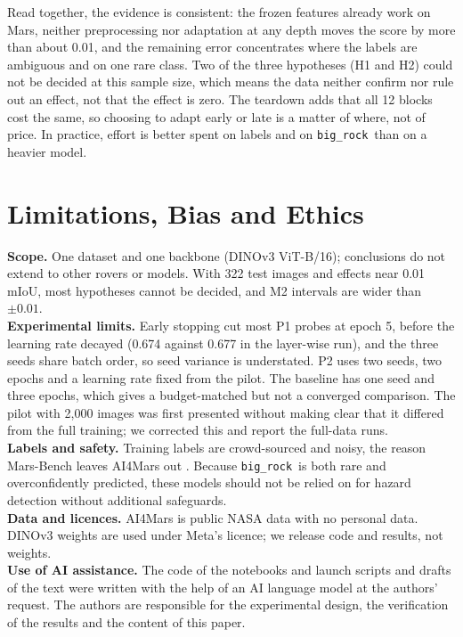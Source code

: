 \documentclass[conference]{IEEEtran}
\newcommand{\bigrock}{\texttt{big\_rock}}
\begin{document}
Read together, the evidence is consistent: the frozen features already work on Mars, neither preprocessing nor adaptation at any depth moves the score by more than about 0.01, and the remaining error concentrates where the labels are ambiguous and on one rare class. Two of the three hypotheses (H1 and H2) could not be decided at this sample size, which means the data neither confirm nor rule out an effect, not that the effect is zero. The teardown adds that all 12 blocks cost the same, so choosing to adapt early or late is a matter of where, not of price. In practice, effort is better spent on labels and on \bigrock\ than on a heavier model.

\section{Limitations, Bias and Ethics}\label{sec:limits}
\textbf{Scope.} One dataset and one backbone (DINOv3 ViT-B/16); conclusions do not extend to other rovers or models. With 322 test images and effects near 0.01 mIoU, most hypotheses cannot be decided, and M2 intervals are wider than $\pm0.01$.\\
\textbf{Experimental limits.} Early stopping cut most P1 probes at epoch 5, before the learning rate decayed (0.674 against 0.677 in the layer-wise run), and the three seeds share batch order, so seed variance is understated. P2 uses two seeds, two epochs and a learning rate fixed from the pilot. The baseline has one seed and three epochs, which gives a budget-matched but not a converged comparison. The pilot with 2{,}000 images was first presented without making clear that it differed from the full training; we corrected this and report the full-data runs.\\
\textbf{Labels and safety.} Training labels are crowd-sourced and noisy, the reason Mars-Bench leaves AI4Mars out \cite{purohit2025marsbench}. Because \bigrock\ is both rare and overconfidently predicted, these models should not be relied on for hazard detection without additional safeguards.\\
\textbf{Data and licences.} AI4Mars is public NASA data with no personal data. DINOv3 weights are used under Meta's licence; we release code and results, not weights.\\
\textbf{Use of AI assistance.} The code of the notebooks and launch scripts and drafts of the text were written with the help of an AI language model at the authors' request. The authors are responsible for the experimental design, the verification of the results and the content of this paper.
\end{document}
